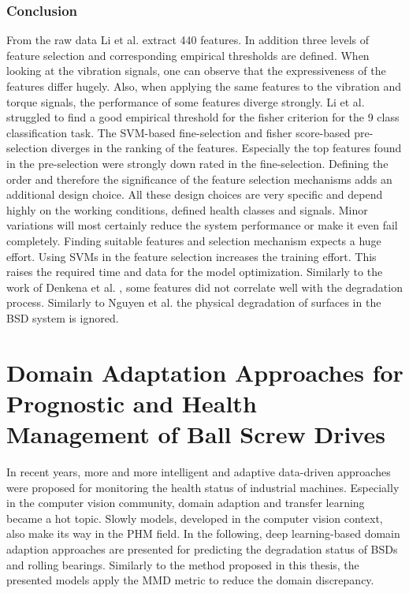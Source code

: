 \subsubsection{Conclusion}
From the raw data Li et al. extract 440 features. In addition three levels of feature selection and corresponding empirical thresholds are defined. When looking at the vibration signals, one can observe that the expressiveness of the features differ hugely. Also, when applying the same features to the vibration and torque signals, the performance of some features diverge strongly. Li et al. struggled to find a good empirical threshold for the fisher criterion for the 9 class classification task. The SVM-based fine-selection and fisher score-based pre-selection diverges in the ranking of the features. Especially the top features found in the pre-selection were strongly down rated in the fine-selection. Defining the order and therefore the significance of the feature selection mechanisms adds an additional design choice. All these design choices are very specific and depend highly on the working conditions, defined health classes and signals. Minor variations will most certainly reduce the system performance or make it even fail completely. Finding suitable features and selection mechanism expects a huge effort. Using SVMs in the feature selection increases the training effort. This raises the required time and data for the model optimization. Similarly to the work of Denkena et al. \cite{Denkena2021}, some features did not correlate well with the degradation process. Similarly to Nguyen et al. \cite{NGUYEN2019} the physical degradation of surfaces in the BSD system is ignored. 

\section{Domain Adaptation Approaches for Prognostic and Health Management of Ball Screw Drives}
In recent years, more and more intelligent and adaptive data-driven approaches were proposed for monitoring the health status of industrial machines. Especially in the computer vision community, domain adaption and transfer learning became a hot topic. Slowly models, developed in the computer vision context, also make its way in the PHM field. In the following, deep learning-based domain adaption approaches are presented for predicting the degradation status of BSDs and rolling bearings. Similarly to the method proposed in this thesis, the presented models apply the MMD metric to reduce the domain discrepancy.


